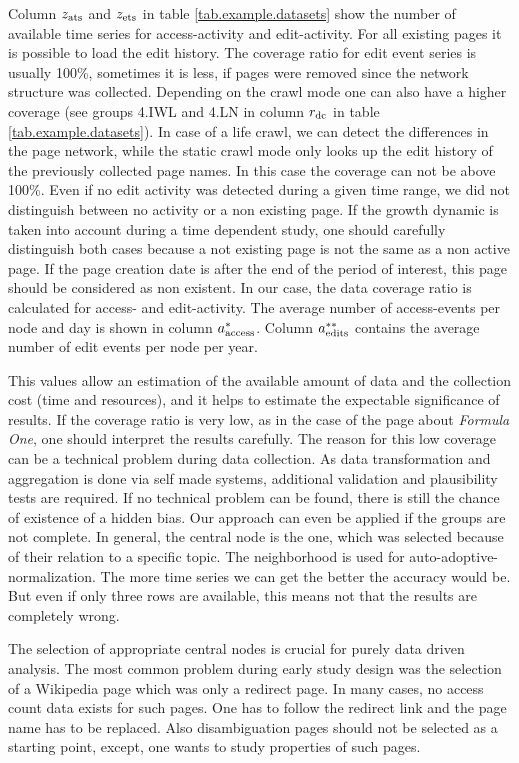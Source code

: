 \documentclass[a4paper,10pt]{scrbook}
\begin{document}
Column $z_{\rm ats}$ and $z_{\rm ets}$ in table \ref{tab.example.datasets} show the number of available time series for access-activity and edit-activity. For all existing pages it is possible to load the edit history. The coverage ratio for edit event series is usually 100\%, sometimes it is less, if pages were removed since the network structure was collected. Depending on the crawl mode one can also have a higher coverage (see groups 4.IWL and 4.LN in column $r_{\rm dc}$ in table \ref{tab.example.datasets}). In case of a life crawl, we can detect the differences in the page network, while the static crawl mode only looks up the edit history of the previously collected page names. In this case the coverage can not be above 100\%.  Even if no edit activity was detected during a given time range, we did not distinguish between no activity or a non existing page. If the growth dynamic is taken into account during a time dependent study, one should carefully distinguish both cases because a not existing page is not the same as a non active page. If the page creation date is after the end of the period of interest, this page should be considered as non existent. In our case, the data coverage ratio is calculated for access- and edit-activity. 
The average number of access-events per node and day is shown in column $a_{\rm access}^{\ast}$. Column $a_{\rm edits}^{\ast\ast}$ contains the average number of edit events per node per year.

This values allow an estimation of the available amount of data and the collection cost (time and resources), and it helps to estimate the expectable significance of results. If the coverage ratio is very low, as in the case of the page about \textit{Formula One}, one should interpret the results carefully. The reason for this low coverage can be a technical problem during data collection. As data transformation and aggregation is done via self made systems, additional validation and plausibility tests are required. If no technical problem can be found, there is still the chance of existence of a hidden bias. Our approach can even be applied if the groups are not complete. In general, the central node is the one, which was selected because of their relation to a specific topic. The neighborhood is used for auto-adoptive-normalization. The more time series we can get the better the accuracy would be. But even if only three rows are available, this means not that the results are completely wrong. 

The selection of appropriate central nodes is crucial for purely data driven analysis. The most common problem during early study design was the selection of a Wikipedia page which was only a redirect page. In many cases, no access count data exists for such pages. One has to follow the redirect link and the page name has to be replaced. Also disambiguation pages should not be selected as a starting point, except, one wants to study properties of such pages. 
\end{document}
